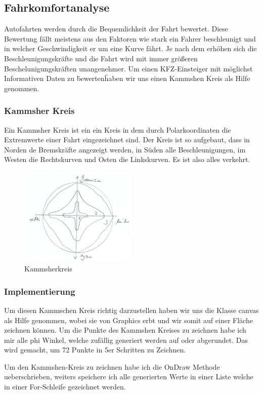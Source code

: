 \subsection{Fahrkomfortanalyse}


Autofahrten werden durch die Bequemlichkeit der Fahrt bewertet. 
Diese Bewertung fällt meistens aus den Faktoren wie stark ein Fahrer beschleunigt und in welcher Geschwindigkeit er um eine Kurve fährt. Je nach dem erhöhen sich die Beschleunigungskräfte und die Fahrt wird mit immer größeren Beschelunigungskräften unangenehmer.
Um einen KFZ-Einsteiger mit möglichst Informativen Daten zu \"bewerten\" haben wir uns einen Kammshen Kreis als Hilfe genommen.

\subsubsection{Kammsher Kreis }
Ein Kammsher Kreis ist ein ein Kreis in dem durch Polarkoordinaten die Extremwerte einer Fahrt eingezeichnet sind.
Der Kreis ist so aufgebaut, dass in Norden de Bremskräfte angezeigt werden, in Süden alle Beschleunigungen, im Westen die Rechtskurven und Osten die Linkskurven.
Es ist also alles verkehrt.
\begin{figure}[!htb]\centering
	\includegraphics[width=0.5\textwidth]{images/kammsherkreis}
	\caption{Kammsherkreis \cite{FAIF.CH3-fahrkomfortanalyse.KammscherKreis}}\label{Fig:Kammsher-Kreis}
\end{figure}

\subsubsection{Implementierung}
Um diesen Kammschen Kreis richtig darzustellen haben wir uns die Klasse canvas als Hilfe genommen, wobei sie von Graphics erbt und wir somit auf einer Fläche zeichnen können.
Um die Punkte des Kammshen Kreises zu zeichnen habe ich mir alle phi Winkel, welche zufällig generiert werden auf oder abgerundet. Das wird gemacht, um 72 Punkte in 5er Schritten zu Zeichnen.  




\newline 



Um den Kammshen-Kreis zu zeichnen habe ich die OnDraw Methode ueberschrieben, weiters speichere ich alle generierten Werte in einer Liste welche in einer For-Schleife gezeichnet werden.